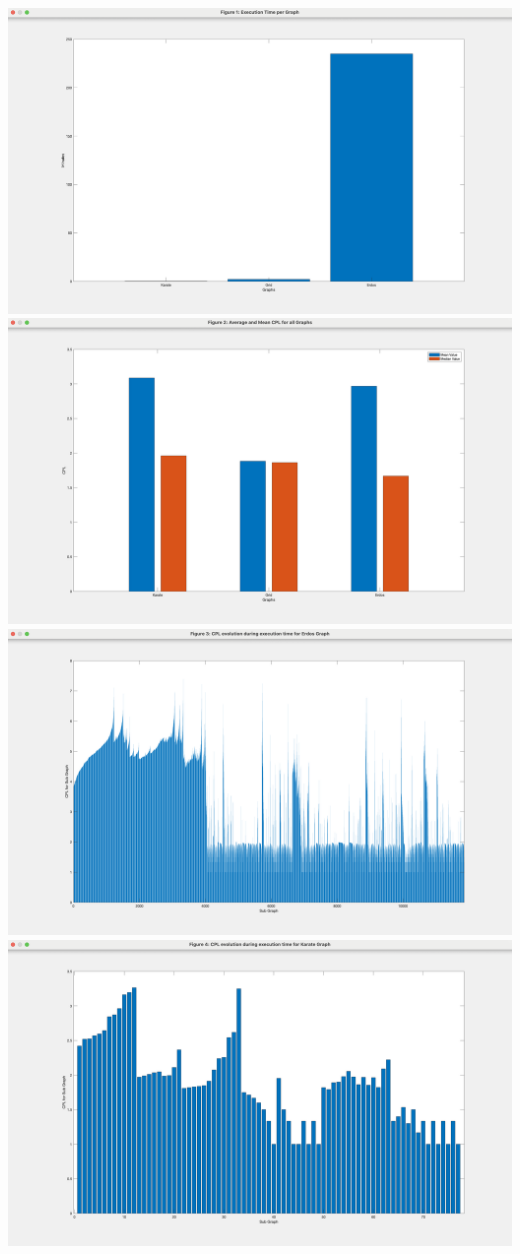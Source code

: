 \documentclass{article}
\begin{document}
\includegraphics[width=\textwidth]{Figure1.png}\bigbreak
\includegraphics[width=\textwidth]{Figure2.png}\bigbreak
\includegraphics[width=\textwidth]{Figure3.png}\bigbreak
\includegraphics[width=\textwidth]{Figure4.png}\bigbreak
\end{document}
